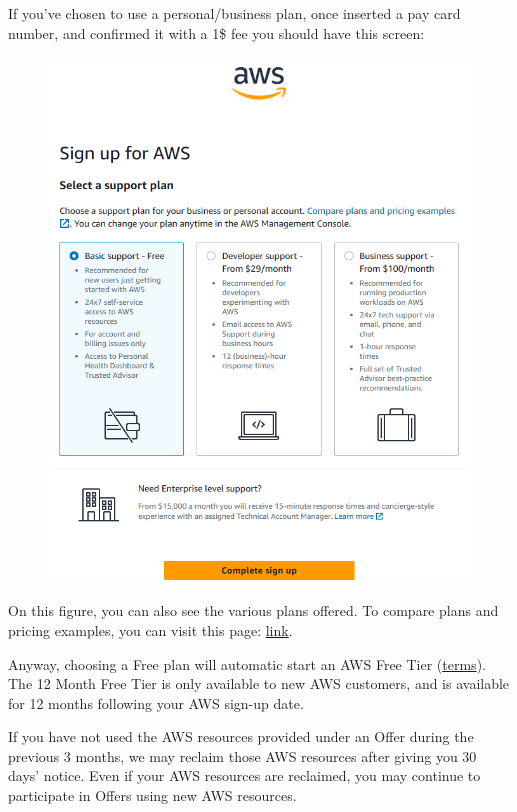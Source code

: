 \documentclass[a4paper]{article}
\begin{document}
    \noindent
    If you've chosen to use a personal/business plan, once inserted a pay card number, and confirmed it with a 1\$ fee you should have this screen:
    \begin{figure}[!htp]
        \centering
        \includegraphics[width=\textwidth]{img/sing-up.png}
    \end{figure}

    \noindent
    On this figure, you can also see the various plans offered. To compare plans and pricing examples, you can visit this page: \href{https://aws.amazon.com/premiumsupport/plans/}{link}.\newline

    \noindent
    Anyway, choosing a Free plan will automatic start an AWS Free Tier (\href{https://aws.amazon.com/free/terms/}{terms}). The 12 Month Free Tier is only available to new AWS customers, and is available for 12 months following your AWS sign-up date.

    If you have not used the AWS resources provided under an Offer during the previous 3 months, we may reclaim those AWS resources after giving you 30 days' notice. Even if your AWS resources are reclaimed, you may continue to participate in Offers using new AWS resources.
\end{document}

